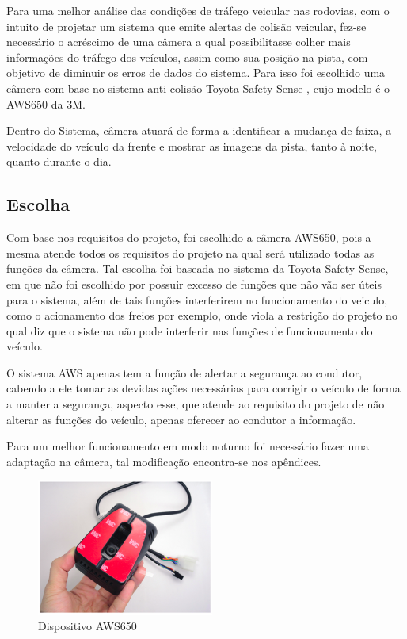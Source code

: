 Para uma melhor análise das condições de tráfego veicular nas rodovias, com o intuito de projetar um sistema que emite alertas de colisão veicular, fez-se necessário o acréscimo de uma câmera a qual possibilitasse colher mais informações do tráfego dos veículos, assim como sua posição na pista, com objetivo de diminuir os erros de dados do sistema. Para isso foi escolhido uma câmera com base no sistema anti colisão  Toyota Safety Sense , cujo modelo é o AWS650 da 3M.

Dentro do Sistema, câmera atuará de forma a identificar a mudança de faixa, a velocidade do veículo da frente e mostrar as imagens da pista, tanto à noite, quanto durante o dia.

\subsection{Escolha}

Com base nos requisitos do projeto, foi escolhido a câmera AWS650, pois a mesma atende todos os requisitos do projeto na qual será utilizado todas as funções da câmera. Tal escolha foi baseada no sistema da Toyota Safety Sense, em que não foi escolhido por possuir excesso de funções que não vão ser úteis para o sistema, além de tais funções interferirem no funcionamento do veiculo, como o acionamento dos freios  por exemplo,  onde viola a restrição do projeto no qual diz que o sistema não pode interferir nas funções de funcionamento do veículo.

O sistema AWS apenas tem a função de alertar a segurança ao condutor, cabendo a ele tomar as devidas ações necessárias para corrigir o veículo de forma a manter a segurança, aspecto esse, que atende ao requisito do projeto de não alterar as funções do veículo, apenas oferecer ao condutor a informação.
	
Para um melhor funcionamento em modo noturno foi necessário fazer uma adaptação na câmera, tal modificação encontra-se nos apêndices.

\begin{figure}[h!]
  \centering
  \includegraphics[width=220px, scale=1]{figuras/sensoraws650}
  \caption{Dispositivo AWS650}
\label{fig:sensoraws650}
\end{figure}

